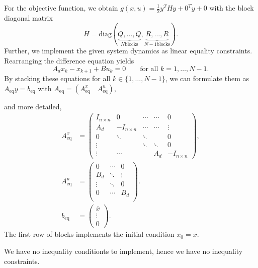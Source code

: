 \documentclass[]{article}
\newcommand{\ind}[2]{{#1}_{\mathrm{#2}}}
\newcommand{\trp}{^T}
\newcommand{\xnull}{x_0}
\newcommand{\xk}{x_k}
\newcommand{\uk}{u_k}
\newcommand{\Ad}{A_d}
\newcommand{\Bd}{B_d}
\newcommand{\xkplus}{x_{k+1}}
\newcommand{\Aeq}{\ind{A}{eq}}
\newcommand{\beq}{\ind{b}{eq}}
\newcommand{\Aeqx}{\Aeq^x}
\newcommand{\Aequ}{\Aeq^u}
\newcommand{\Aineq}{\ind{A}{{  in}}}
\newcommand{\bineq}{\ind{b}{{  in}}}
\newcommand{\xbar}{\bar{x}}
\newcommand{\half}{\frac{1}{2}}
\newcommand{\R}{\mathbb{R}}
\begin{document}
\begin{enumerate}
	 For the objective function, we obtain $ g(x,u) = \half y\trp H y + 0 \trp y + 0 $ with
 the block diagonal matrix \[ H = \mathrm{diag} (\underbrace{Q,\dots,Q}_{N \text{blocks}},\underbrace{R,\dots,R}_{N-1 \text{blocks}}). \]
 Further, we implement the given system dynamics as linear equality constraints. Rearranging the difference equation yields \[ \Ad\xk - \xkplus + B\uk = 0 \qquad \text{for all } k = 1,\dots,N-1. \]
 By stacking these equations for all $ k \in \{1,\dots,N-1\} $, we can formulate them as
% 
  $ \Aeq y = \beq $ with
  $ \Aeq =   \left( \Aeqx \quad \Aequ \right), $
  
  
  and more detailed,
 \begin{align*}
 \Aeqx &=  \begin{pmatrix}
 I_{n\times n} & 0 & \cdots & \cdots & 0\\
 \Ad & -I_{n\times n} & \cdots & \cdots & \vdots\\
 0 & \ddots & \ddots &  &  0\\
 \vdots & & \ddots  & \ddots & 0\\
 \vdots & \cdots & & \Ad & -I_{n\times n}
 \end{pmatrix},\\
 \Aequ &= \begin{pmatrix}
 0 & \cdots & 0\\
 \Bd &\ddots &\vdots\\
 \vdots &\ddots & 0\\
 0 & \cdots & \Bd\\
 \end{pmatrix}.\\
 \beq &= \begin{pmatrix}
 \xbar\\\vdots\\0
 \end{pmatrix}.
 \end{align*}
The first row of blocks implements the initial condition $ \xnull = \xbar $.

We have no inequality conditionts to implement, hence we have no inequality constraints. 


\end{enumerate}
\end{document}
